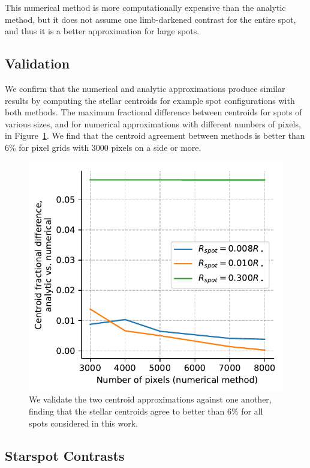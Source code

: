 This numerical method is more computationally expensive than the analytic method, but it does not assume one limb-darkened contrast for the entire spot, and thus it is a better approximation for large spots.

\subsection{Validation}

We confirm that the numerical and analytic approximations produce similar results by computing the stellar centroids for example spot configurations with both methods. The maximum fractional difference between centroids for spots of various sizes, and for numerical approximations with different numbers of pixels, in Figure~\ref{fig:valid}. We find that the centroid agreement between methods is better than 6\% for pixel grids with 3000 pixels on a side or more.

\begin{figure}
\centering
\includegraphics[scale=0.75]{gaia/validation.pdf}
\caption{We validate the two centroid approximations against one another, finding that the stellar centroids agree to better than $6\%$ for all spots considered in this work.}
\label{fig:valid}
\end{figure}

\subsection{Starspot Contrasts} \label{sec:contrast}

